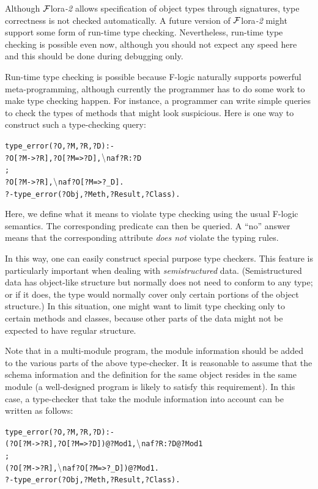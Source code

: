\documentclass[11pt]{article}
\newcommand{\FLSYSTEM}{{\mbox{\sc ${\cal F}${lora}\rm\emph{-2}}}\xspace}
\newcommand{\fl}{\mbox{F-logic}\xspace}
\newcommand{\RULELOGNAF}{{\texttt{\ensuremath{\tt\backslash}naf}}\xspace}
\begin{document}
Although \FLSYSTEM allows specification of object types through signatures,
type correctness is not checked automatically.
A future version of \FLSYSTEM might support some form of run-time type
checking. Nevertheless, run-time type checking is possible even now,
although you should not expect any speed here and this should be done
during debugging only.

Run-time type checking is possible because \fl naturally supports powerful
meta-programming, although currently the programmer has to do some work to
make type checking happen.  For instance, a programmer can write simple
queries to check the types of methods that might look suspicious.  Here is
one way to construct such a type-checking query:
\begin{alltt}
type_error(?O,?M,?R,?D) :-
       ?O[?M->?R], ?O[?M=>?D], \RULELOGNAF ?R:?D
       ;
       ?O[?M->?R], \RULELOGNAF ?O[?M=>?_D].
?- type_error(?Obj,?Meth,?Result,?Class).
\end{alltt}
Here, we define what it means to violate type checking using the usual
\fl semantics. The corresponding predicate can then be queried. A
``no'' answer means that the corresponding attribute \emph{does not}
violate the typing rules.

In this way, one can easily construct special purpose type checkers.  This
feature is particularly important when dealing with \emph{semistructured}
data. (Semistructured data has object-like structure but normally does not
need to conform to any type; or if it does, the type would normally cover
only certain portions of the object structure.) In this situation, one
might want to limit type checking only to certain methods and classes,
because other parts of the data might not be expected to have regular
structure.

Note that in a multi-module program, the module information should be added
to the various parts of the above type-checker. It is reasonable to assume
that the schema information and the definition for the same object
resides in the same module (a well-designed program is likely to satisfy
this requirement). In this case, a type-checker that take the module
information into account can be written as follows:
\begin{alltt}
type_error(?O,?M,?R,?D) :-
       (?O[?M->?R], ?O[?M=>?D])@?Mod1, \RULELOGNAF ?R:?D@?Mod1
       ;
       (?O[?M->?R], \RULELOGNAF ?O[?M=>?_D])@?Mod1.
?- type_error(?Obj,?Meth,?Result,?Class).
\end{alltt}
\end{document}

